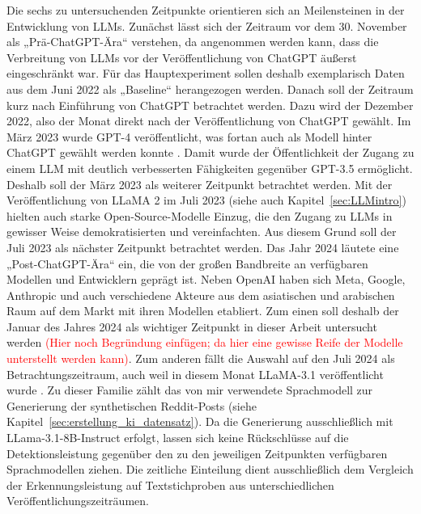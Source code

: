 Die sechs zu untersuchenden Zeitpunkte orientieren sich an Meilensteinen in der Entwicklung von LLMs. Zunächst lässt sich der Zeitraum vor dem 30. November als „Prä-ChatGPT-Ära“ verstehen, da angenommen werden kann, dass die Verbreitung von LLMs vor der Veröffentlichung von ChatGPT äußerst eingeschränkt war. Für das Hauptexperiment sollen deshalb exemplarisch Daten aus dem Juni 2022 als „Baseline“ herangezogen werden. Danach soll der Zeitraum kurz nach Einführung von ChatGPT betrachtet werden. Dazu wird der Dezember 2022, also der Monat direkt nach der Veröffentlichung von ChatGPT gewählt. Im März 2023 wurde GPT-4 veröffentlicht, was fortan auch als Modell hinter ChatGPT gewählt werden konnte \autocite{openai2023}. Damit wurde der Öffentlichkeit der Zugang zu einem LLM mit deutlich verbesserten Fähigkeiten gegenüber GPT-3.5 ermöglicht. Deshalb soll der März 2023 als weiterer Zeitpunkt betrachtet werden. Mit der Veröffentlichung von LLaMA 2 im Juli 2023 (siehe auch Kapitel~\ref{sec:LLMintro}) hielten auch starke Open-Source-Modelle Einzug, die den Zugang zu LLMs in gewisser Weise demokratisierten und vereinfachten. Aus diesem Grund soll der Juli 2023 als nächster Zeitpunkt betrachtet werden. Das Jahr 2024 läutete eine „Post-ChatGPT-Ära“ ein, die von der großen Bandbreite an verfügbaren Modellen und Entwicklern geprägt ist. Neben OpenAI haben sich Meta, Google, Anthropic und auch verschiedene Akteure aus dem asiatischen und arabischen Raum auf dem Markt mit ihren Modellen etabliert. Zum einen soll deshalb der Januar des Jahres 2024 als wichtiger Zeitpunkt in dieser Arbeit untersucht werden \textcolor{red}{(Hier noch Begründung einfügen; da hier eine gewisse Reife der Modelle unterstellt werden kann)}. Zum anderen fällt die Auswahl auf den Juli 2024 als Betrachtungszeitraum, auch weil in diesem Monat LLaMA-3.1 veröffentlicht wurde \autocite{grattafiori2024llama3herdmodels}. Zu dieser Familie zählt das von mir verwendete Sprachmodell zur Generierung der synthetischen Reddit-Posts (siehe Kapitel~\ref{sec:erstellung_ki_datensatz}). Da die Generierung ausschließlich mit LLama-3.1-8B-Instruct erfolgt, lassen sich keine Rückschlüsse auf die Detektionsleistung gegenüber den zu den jeweiligen Zeitpunkten verfügbaren Sprachmodellen ziehen. Die zeitliche Einteilung dient ausschließlich dem Vergleich der Erkennungsleistung auf Textstichproben aus unterschiedlichen Veröffentlichungszeiträumen. \\
